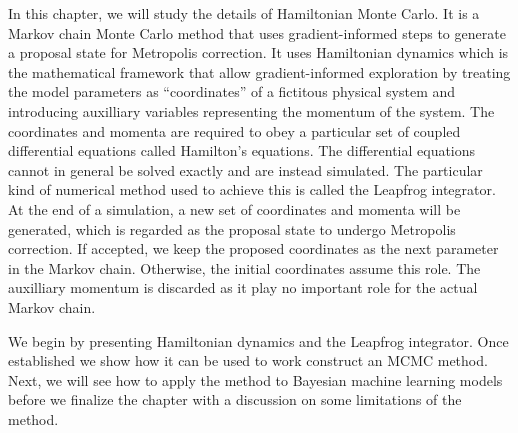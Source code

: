 In this chapter, we will study the details of Hamiltonian Monte Carlo. It is a Markov chain Monte Carlo method that uses gradient-informed
steps to generate a proposal state for Metropolis correction. It uses Hamiltonian dynamics
which is the mathematical framework that allow gradient-informed exploration by treating the model parameters
as ``coordinates'' of a fictitous physical system and introducing auxilliary variables representing the momentum of the system. 
The coordinates and momenta are required to obey a particular set of coupled differential equations called Hamilton's equations.
The differential equations cannot in general be solved exactly and are instead simulated. 
The particular kind of numerical method used to achieve this
is called the Leapfrog integrator. At the end of a simulation, a new set of coordinates and momenta 
will be generated,
which is regarded as the proposal state to undergo Metropolis correction.
If accepted, we keep the proposed coordinates as the next parameter in the Markov chain. Otherwise, the initial coordinates
assume this role. The auxilliary momentum is discarded as it play no important role for the actual Markov chain.

We begin by presenting Hamiltonian dynamics and the Leapfrog integrator.
Once established we show how it can be used to work construct an MCMC method.
Next, we will see how to apply the method to Bayesian machine learning models before we finalize the
chapter with a discussion on some limitations of the method.






